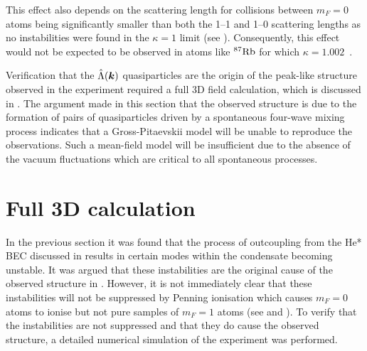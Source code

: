 This effect also depends on the scattering length for collisions between $m_F=0$ atoms being significantly smaller than both the 1--1 and 1--0 scattering lengths as no instabilities were found in the $\kappa = 1$ limit (see ). 
Consequently, this effect would not be expected to be observed in atoms like $ ^{87} \text{Rb} $ for which $\kappa = 1.002$~\citep{Kempen:2002,Widera:2006}.

Verification that the $\hat{\Lambda}(\bm{k})$ quasiparticles are the origin of the peak-like structure observed in the experiment required a full 3D field calculation, which is discussed in .  The argument made in this section that the observed structure is due to the formation of pairs of quasiparticles driven by a spontaneous four-wave mixing process indicates that a Gross-Pitaevskii model will be unable to reproduce the observations. Such a mean-field model will be insufficient due to the absence of the vacuum fluctuations which are critical to all spontaneous processes.

\section{Full 3D calculation}
\label{Peaks:3DCalculation}
In the previous section it was found that the process of outcoupling from the He* BEC discussed in  results in certain modes within the condensate becoming unstable. It was argued that these instabilities are the original cause of the observed structure in . However, it is not immediately clear that these instabilities will not be suppressed by Penning ionisation which causes $m_F=0$ atoms to ionise but not pure samples of $m_F=1$ atoms (see  and ). To verify that the instabilities are not suppressed and that they do cause the observed structure, a detailed numerical simulation of the experiment was performed.

